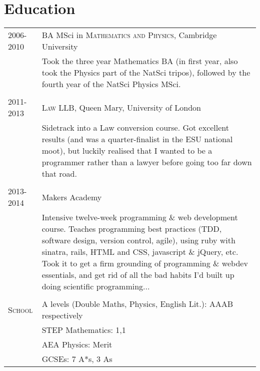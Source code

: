 \documentclass[a4paper,10pt]{article}
\begin{document}
\section{Education}
\begin{tabularx}{\linewidth}{>{\raggedleft\hsize=0.42\hsize}X>{\hsize=1.5\hsize}X} 
    \textsc{2006-2010} & BA MSci in \textsc{Mathematics and Physics}, Cambridge University\\
    & \footnotesize{Took the three year Mathematics BA (in first year, also took the Physics part 
    of the NatSci tripos), followed by the fourth year of the NatSci Physics MSci.} \\
    \multicolumn{2}{c}{} \\
    \textsc{2011-2013} & \textsc{Law LLB}, Queen Mary, University of
London\\
    & \footnotesize{Sidetrack into a Law conversion course. Got excellent results (and was a 
    quarter-finalist in the ESU national moot), but luckily realised that I wanted to be a 
    programmer rather than a lawyer before going too far down that road.} \\
    \multicolumn{2}{c}{} \\
    \textsc{2013-2014} & Makers Academy \\
    & \footnotesize{Intensive twelve-week programming \& web development course.
    Teaches programming best practices (TDD, software design, version control,
    agile), using ruby with sinatra, rails, HTML and CSS, javascript \& jQuery,
   etc. Took it to get a firm grounding of programming \& webdev essentials, and
    get rid of all the bad habits I'd built up doing scientific programming...} \\
    \multicolumn{2}{c}{} \\
    \textsc{School} & \footnotesize{A levels (Double Maths, Physics, English Lit.): AAAB respectively} \\
    & \footnotesize{STEP Mathematics: 1,1} \\
    & \footnotesize{AEA Physics: Merit} \\
    & \footnotesize{GCSEs: 7 A*s, 3 As}
\end{tabularx}
\end{document}
